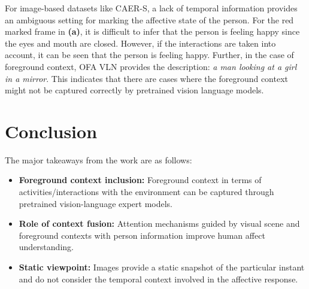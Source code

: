 For image-based datasets like CAER-S, a lack of temporal information provides an ambiguous setting for marking the affective state of the person. For the red marked frame in \textbf{(a)}, it is difficult to infer that the person is feeling happy since the eyes and mouth are closed. However, if the interactions are taken into account, it can be seen that the person is feeling happy. Further, in the case of foreground context, OFA VLN provides the description: \textit{a man looking at a girl in a mirror}. This indicates that there are cases where the foreground context might not be captured correctly by pretrained vision language models.


\section{Conclusion}

The major takeaways from the work are as follows:

\begin{itemize}

\item \textbf{Foreground context inclusion:} Foreground context in terms of activities/interactions with the environment can be captured through pretrained vision-language expert models.
 
\item \textbf{Role of context fusion:} Attention mechanisms guided by visual scene and foreground contexts with person information improve human affect understanding.

\item \textbf{Static viewpoint:} Images provide a static snapshot of the particular instant and do not consider the temporal context involved in the affective response.

\end{itemize}

